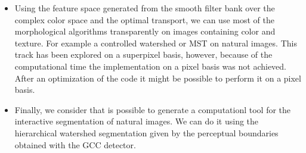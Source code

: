 \begin{itemize}
	 \item Using the feature space generated from the smooth filter bank over the complex color space and the optimal transport, we can use most of the morphological algorithms transparently on images containing color and texture. For example a controlled watershed or MST on natural images. This track has been explored on a superpixel basis, however, because of the computational time the implementation on a pixel basis was not achieved. After an optimization of the code it might be possible to perform it on a pixel basis.

	 \item Finally, we consider that is possible to generate a computationl tool for the interactive segmentation of natural images. We can do it using the hierarchical watershed segmentation given by the perceptual boundaries obtained with the GCC detector.
\end{itemize}

